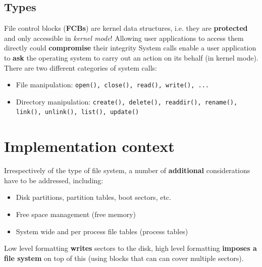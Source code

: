 \documentclass{article}
\begin{document}
\subsection{Types}
\begin{flushleft}
File control blocks (\textbf{FCBs}) are kernel data structures, i.e. they are \textbf{protected} and only accessible in \textit{kernel mode}! Allowing user applications to access them directly could \textbf{compromise} their integrity System calls enable a user application to \textbf{ask} the operating system to carry out an action on its behalf (in kernel mode).\\
There are two different categories of system calls:
\begin{itemize}
	\item File manipulation: \texttt{open(), close(), read(), write(), ...}
	\item Directory manipulation: \texttt{create(), delete(), readdir(), rename(), link(), unlink(), list(), update()}
\end{itemize}
\end{flushleft}

\section{Implementation context}
\begin{flushleft}
Irrespectively of the type of file system, a number of \textbf{additional} considerations have to be addressed, including:
\begin{itemize}
	\item Disk partitions, partition tables, boot sectors, etc.
	\item Free space management (free memory)
	\item System wide and per process file tables (process tables)
\end{itemize}
Low level formatting \textbf{writes} sectors to the disk, high level formatting \textbf{imposes a file system} on top of this (using blocks that can can cover multiple sectors).
\end{flushleft}
\end{document}
